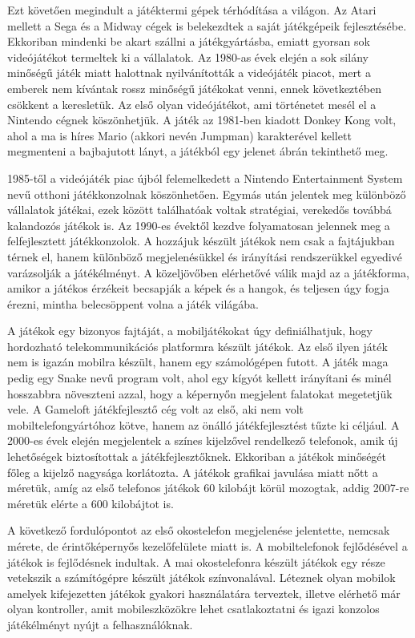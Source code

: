 
Ezt követően megindult a játéktermi gépek térhódítása a világon. 
Az Atari mellett a Sega és a Midway cégek is belekezdtek a saját játékgépeik fejlesztésébe. 
Ekkoriban mindenki be akart szállni a játékgyártásba, emiatt gyorsan sok videójátékot termeltek ki a vállalatok. 
Az 1980-as évek elején a sok silány minőségű játék miatt halottnak nyilvánították a videójáték piacot, mert a emberek nem kívántak rossz minőségű játékokat venni, ennek következtében csökkent a keresletük. 
Az első olyan videójátékot, ami történetet mesél el a Nintendo cégnek köszönhetjük. 
A játék az 1981-ben kiadott Donkey Kong volt, ahol a ma is híres Mario (akkori nevén Jumpman) karakterével kellett megmenteni a bajbajutott lányt, a játékból egy jelenet  ábrán tekinthető meg. 

1985-től a videójáték piac újból felemelkedett a Nintendo Entertainment System nevű otthoni játékkonzolnak köszönhetően. 
Egymás után jelentek meg különböző vállalatok játékai, ezek között találhatóak voltak stratégiai, verekedős továbbá kalandozós játékok is. 
Az 1990-es évektől kezdve folyamatosan jelennek meg a felfejlesztett játékkonzolok. 
A hozzájuk készült játékok nem csak a fajtájukban térnek el, hanem különböző megjelenésükkel és irányítási rendszerükkel egyedivé varázsolják a játékélményt. 
A közeljövőben elérhetővé válik majd az a játékforma, amikor a játékos érzékeit becsapják a képek és a hangok, és teljesen úgy fogja érezni, mintha belecsöppent volna a játék világába. 

A játékok egy bizonyos fajtáját, a mobiljátékokat úgy definiálhatjuk, hogy hordozható telekommunikációs platformra készült játékok. 
Az első ilyen játék nem is igazán mobilra készült, hanem egy számológépen futott. 
A játék maga pedig egy Snake nevű program volt, ahol egy kígyót kellett irányítani és minél hosszabbra növeszteni azzal, hogy a képernyőn megjelent falatokat megetetjük vele. 
A Gameloft játékfejlesztő cég volt az első, aki nem volt mobiltelefongyártóhoz kötve, hanem az önálló játékfejlesztést tűzte ki céljául. 
A 2000-es évek elején megjelentek a színes kijelzővel rendelkező telefonok, amik új lehetőségek biztosítottak a játékfejlesztőknek. 
Ekkoriban a játékok minőségét főleg a kijelző nagysága korlátozta. 
A játékok grafikai javulása miatt nőtt a méretük, amíg az első telefonos játékok 60 kilobájt körül mozogtak, addig 2007-re méretük elérte a 600 kilobájtot is. 

A következő fordulópontot az első okostelefon megjelenése jelentette, nemcsak mérete, de érintőképernyős kezelőfelülete miatt is. 
A mobiltelefonok fejlődésével a játékok is fejlődésnek indultak. 
A mai okostelefonra készült játékok egy része vetekszik a számítógépre készült játékok színvonalával. 
Léteznek olyan mobilok amelyek kifejezetten játékok gyakori használatára terveztek, illetve elérhető már olyan kontroller, amit mobileszközökre lehet csatlakoztatni és igazi konzolos játékélményt nyújt a felhasználóknak. 

